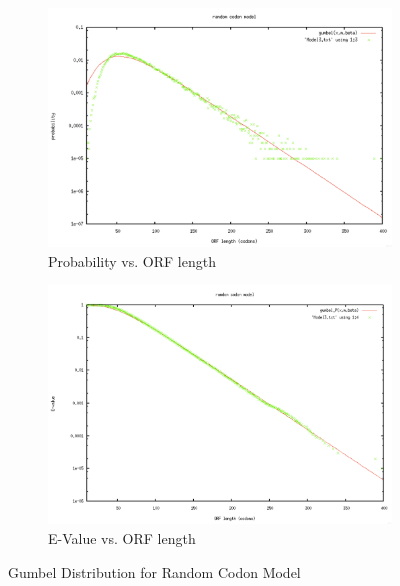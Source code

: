 \documentclass[11pt]{article}
\begin{document}
\begin{figure}[!htb]
        \centering
        \begin{subfigure}[b]{0.49\textwidth}
                \centering
		\includegraphics[width=\textwidth]{Model3GumProb.pdf} 
		\caption{Probability vs. ORF length}
        \end{subfigure}
        \begin{subfigure}[b]{0.49\textwidth}
                \centering
		\includegraphics[width=\textwidth]{Model3GumE.pdf} 
		\caption{E-Value vs. ORF length}
        \end{subfigure}

        \caption{Gumbel Distribution for Random Codon Model}\label{fig:Model3Gum}
\end{figure}
\end{document}
